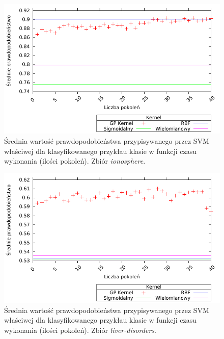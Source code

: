                 \begin{figure}
                \includegraphics[scale=0.90]{figures/results/probability/probability-ionosphere}
                \caption{Średnia wartość prawdopodobieństwa przypisywanego przez SVM właściwej dla klasyfikowanego przykłau klasie w funkcji czasu wykonania (ilości pokoleń). Zbiór \emph{ionosphere}.\label{fig:probability-ionosphere}}
        \end{figure}


        \begin{figure}
                \includegraphics[scale=0.90]{figures/results/probability/probability-liver-disorders}
                \caption{Średnia wartość prawdopodobieństwa przypisywanego przez SVM właściwej dla klasyfikowanego przykłau klasie w funkcji czasu wykonania (ilości pokoleń). Zbiór \emph{liver-disorders}.\label{fig:probability-liver-disorders}}
        \end{figure}


